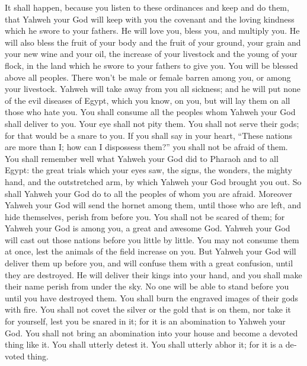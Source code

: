 \begin{paracol}{2}
\begin{otherlanguage}{english}
 It shall happen, because you listen to these ordinances
and keep and do them, that Yahweh your God will keep with you the
covenant and the loving kindness which he swore to your fathers.
 He will love you, bless you, and multiply you. He will
also bless the fruit of your body and the fruit of your ground, your
grain and your new wine and your oil, the increase of your livestock and
the young of your flock, in the land which he swore to your fathers to
give you.  You will be blessed above all peoples. There
won't be male or female barren among you, or among your livestock.
 Yahweh will take away from you all sickness; and he will
put none of the evil diseases of Egypt, which you know, on you, but will
lay them on all those who hate you.  You shall consume
all the peoples whom Yahweh your God shall deliver to you. Your eye
shall not pity them. You shall not serve their gods; for that would be a
snare to you.  If you shall say in your heart, ``These
nations are more than I; how can I dispossess them?'' 
you shall not be afraid of them. You shall remember well what Yahweh
your God did to Pharaoh and to all Egypt:  the great
trials which your eyes saw, the signs, the wonders, the mighty hand, and
the outstretched arm, by which Yahweh your God brought you out. So shall
Yahweh your God do to all the peoples of whom you are afraid.
 Moreover Yahweh your God will send the hornet among
them, until those who are left, and hide themselves, perish from before
you.  You shall not be scared of them; for Yahweh your
God is among you, a great and awesome God.  Yahweh your
God will cast out those nations before you little by little. You may not
consume them at once, lest the animals of the field increase on you.
 But Yahweh your God will deliver them up before you, and
will confuse them with a great confusion, until they are destroyed.
 He will deliver their kings into your hand, and you
shall make their name perish from under the sky. No one will be able to
stand before you until you have destroyed them.  You
shall burn the engraved images of their gods with fire. You shall not
covet the silver or the gold that is on them, nor take it for yourself,
lest you be snared in it; for it is an abomination to Yahweh your God.
 You shall not bring an abomination into your house and
become a devoted thing like it. You shall utterly detest it. You shall
utterly abhor it; for it is a devoted thing.


\end{otherlanguage}
\end{paracol}

